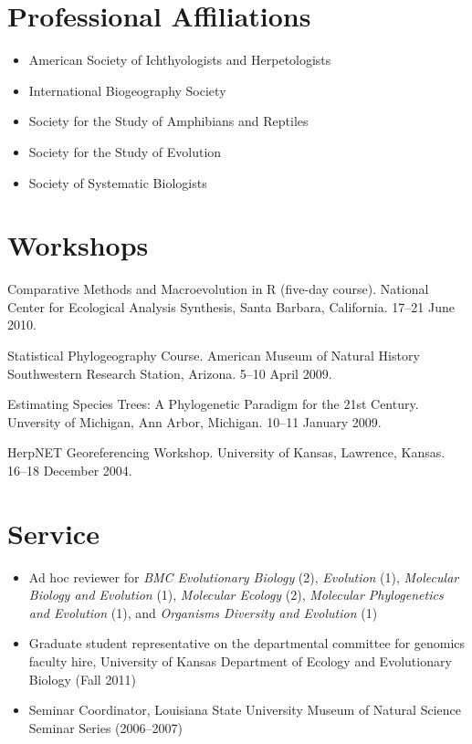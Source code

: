 \documentclass[10pt]{article}
\newenvironment{myItemize}{
  \begin{itemize}
    \setlength{\leftskip}{-4mm}
    \setlength{\itemsep}{0.25em}
    \setlength{\parskip}{0pt}
    \setlength{\parsep}{0.5em}}
  {\end{itemize}}
\newcommand{\myHangIndent}{\hangindent=5mm}
\begin{document}
\section*{Professional Affiliations}
\begin{myItemize}
\item American Society of Ichthyologists and Herpetologists
\item International Biogeography Society
\item Society for the Study of Amphibians and Reptiles
\item Society for the Study of Evolution
\item Society of Systematic Biologists
\end{myItemize}

\section*{Workshops}
\myHangIndent
Comparative Methods and Macroevolution in R (five-day course).
National Center for Ecological Analysis Synthesis, Santa Barbara, California.
17--21 June 2010.

\myHangIndent
Statistical Phylogeography Course.
American Museum of Natural History Southwestern Research Station, Arizona.
5--10 April 2009.

\myHangIndent
Estimating Species Trees: A Phylogenetic Paradigm for the 21st Century.
Unversity of Michigan, Ann Arbor, Michigan.
10--11 January 2009.

\myHangIndent
HerpNET Georeferencing Workshop.
University of Kansas, Lawrence, Kansas.
16--18 December 2004.

\section*{Service}
\begin{myItemize}
\item Ad hoc reviewer for
    \emph{BMC Evolutionary Biology} (2),
    \emph{Evolution} (1),
    \emph{Molecular Biology and Evolution} (1),
    \emph{Molecular Ecology} (2),
    \emph{Molecular Phylogenetics and Evolution} (1), and
    \emph{Organisms Diversity and Evolution} (1)
\item Graduate student representative on the departmental committee for
    genomics faculty hire, University of Kansas Department of Ecology and
    Evolutionary Biology (Fall 2011)
\item Seminar Coordinator, Louisiana State University Museum of Natural Science
    Seminar Series (2006--2007)
\end{myItemize}
\end{document}
